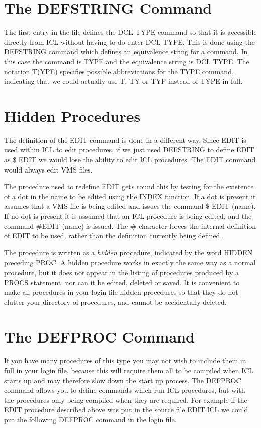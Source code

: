 \documentclass[twoside,11pt]{report}
\newcommand{\xlabel}[1]{}
\begin{document}
\section{\xlabel{the_defstring_command}The DEFSTRING Command}

The first entry in the file defines the DCL TYPE command so that it is
accessible directly from ICL without having to do enter DCL TYPE. This is
done using the DEFSTRING command which defines an equivalence string for
a command. In this case the command is TYPE and the equivalence string is
DCL TYPE. The notation T(YPE) specifies possible abbreviations for the
TYPE command, indicating that we could actually use T, TY or TYP instead
of TYPE in full.

\section{\xlabel{hidden_procedures}Hidden Procedures}

The definition of the EDIT command is done in a different way. Since EDIT
is used within ICL to edit procedures, if we just used DEFSTRING to define
EDIT as \$ EDIT we would lose the ability to edit ICL procedures. The EDIT
command would always edit VMS files.

The procedure used to redefine EDIT gets round this by testing for the
existence of a dot in the name to be edited using the INDEX function. If
a dot is present it assumes that a VMS file is being edited and issues the
command \$ EDIT (name). If no dot is present it is assumed that an ICL
procedure is being edited, and the command \#EDIT (name) is issued. The \#
character forces the internal definition of EDIT to be used, rather than
the definition currently being defined.

The procedure is written as a {\em hidden} procedure, indicated by the word
HIDDEN preceding PROC. A hidden procedure works in exactly the same way
as a normal procedure, but it does not appear in the listing of procedures
produced by a PROCS statement, nor can it be edited, deleted or saved. It
is convenient to make all procedures in your login file hidden procedures
so that they do not clutter your directory of procedures, and cannot be
accidentally deleted.

\section{\xlabel{the_defproc_command}The DEFPROC Command}

If you have many procedures of this type you may not wish to include them
in full in your login file, because this will require them all to be compiled
when ICL starts up and may therefore slow down the start up process. The
DEFPROC command allows you to define commands which run ICL procedures,
but with the procedures only being compiled when they are required. For
example if the EDIT procedure described above was put in the source file
EDIT.ICL we could put the following DEFPROC command in the login file.
\end{document}
